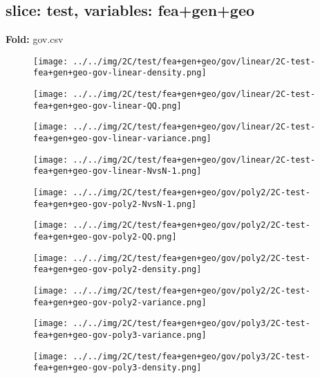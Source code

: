 \subsection{slice: test, variables: fea+gen+geo}
\textbf{Fold:} gov.csv
\begin{figure}[H]
\centering	\texttt{[image: ../../img/2C/test/fea+gen+geo/gov/linear/2C-test-fea+gen+geo-gov-linear-density.png]}
\end{figure}
\begin{figure}[H]
\centering	\texttt{[image: ../../img/2C/test/fea+gen+geo/gov/linear/2C-test-fea+gen+geo-gov-linear-QQ.png]}
\end{figure}
\begin{figure}[H]
\centering	\texttt{[image: ../../img/2C/test/fea+gen+geo/gov/linear/2C-test-fea+gen+geo-gov-linear-variance.png]}
\end{figure}
\begin{figure}[H]
\centering	\texttt{[image: ../../img/2C/test/fea+gen+geo/gov/linear/2C-test-fea+gen+geo-gov-linear-NvsN-1.png]}
\end{figure}
\begin{figure}[H]
\centering	\texttt{[image: ../../img/2C/test/fea+gen+geo/gov/poly2/2C-test-fea+gen+geo-gov-poly2-NvsN-1.png]}
\end{figure}
\begin{figure}[H]
\centering	\texttt{[image: ../../img/2C/test/fea+gen+geo/gov/poly2/2C-test-fea+gen+geo-gov-poly2-QQ.png]}
\end{figure}
\begin{figure}[H]
\centering	\texttt{[image: ../../img/2C/test/fea+gen+geo/gov/poly2/2C-test-fea+gen+geo-gov-poly2-density.png]}
\end{figure}
\begin{figure}[H]
\centering	\texttt{[image: ../../img/2C/test/fea+gen+geo/gov/poly2/2C-test-fea+gen+geo-gov-poly2-variance.png]}
\end{figure}
\begin{figure}[H]
\centering	\texttt{[image: ../../img/2C/test/fea+gen+geo/gov/poly3/2C-test-fea+gen+geo-gov-poly3-variance.png]}
\end{figure}
\begin{figure}[H]
\centering	\texttt{[image: ../../img/2C/test/fea+gen+geo/gov/poly3/2C-test-fea+gen+geo-gov-poly3-density.png]}
\end{figure}
